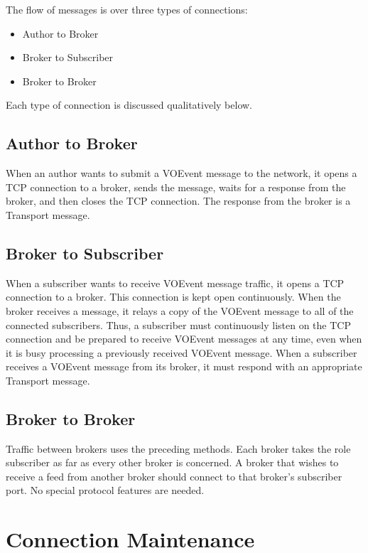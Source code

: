 \documentclass[a4paper,11pt]{ivoa}
\begin{document}
The flow of messages is over three types of connections:

\begin{itemize}
    \item{Author to Broker}
    \item{Broker to Subscriber}
    \item{Broker to Broker}
\end{itemize}

Each type of connection is discussed qualitatively below.

\subsection{Author to Broker}

When an author wants to submit a VOEvent message to the network, it opens a
TCP connection to a broker, sends the message, waits for a response from the
broker, and then closes the TCP connection. The response from the broker is a
Transport message.

\subsection{Broker to Subscriber}

When a subscriber wants to receive VOEvent message traffic, it opens a TCP
connection to a broker. This connection is kept open continuously. When the
broker receives a message, it relays a copy of the VOEvent message to all of
the connected subscribers. Thus, a subscriber must continuously listen on the
TCP connection and be prepared to receive VOEvent messages at any time, even
when it is busy processing a previously received VOEvent message. When a
subscriber receives a VOEvent message from its broker, it must respond with an
appropriate Transport message.

\subsection{Broker to Broker}

Traffic between brokers uses the preceding methods. Each broker takes the role
subscriber as far as every other broker is concerned. A broker that wishes to
receive a feed from another broker should connect to that broker's subscriber
port. No special protocol features are needed.

\section{Connection Maintenance}
\label{sec:maintenance}
\end{document}
